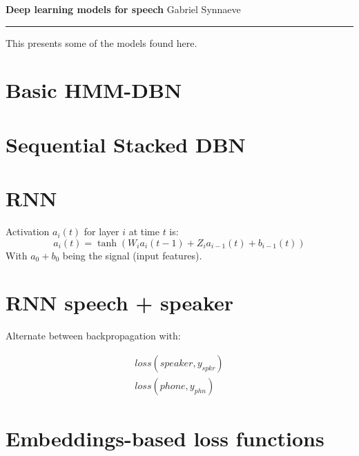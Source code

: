 \documentclass[a4paper,12pt]{article}
\begin{document}
\begin{center}
{\fontsize{20pt}{20pt} \selectfont \textbf{Deep learning models for speech}}
\vskip 10pt
Gabriel Synnaeve
\vskip 10pt
\hrule height 4pt
\end{center}

This presents some of the models found here.

\section{Basic HMM-DBN}


\section{Sequential Stacked DBN}


\section{RNN}

Activation $a_i(t)$ for layer $i$ at time $t$ is:
\begin{equation}
    a_i(t) = \tanh (W_i a_i(t-1) + Z_i a_{i-1}(t) + b_{i-1}(t))
\end{equation}
With $a_0 + b_0$ being the signal (input features).

\section{RNN speech + speaker}

Alternate between backpropagation with:

\begin{eqnarray}
    loss(speaker, y_{spkr}) \\
    loss(phone, y_{phn})  
\end{eqnarray}


\section{Embeddings-based loss functions}

\end{document}
